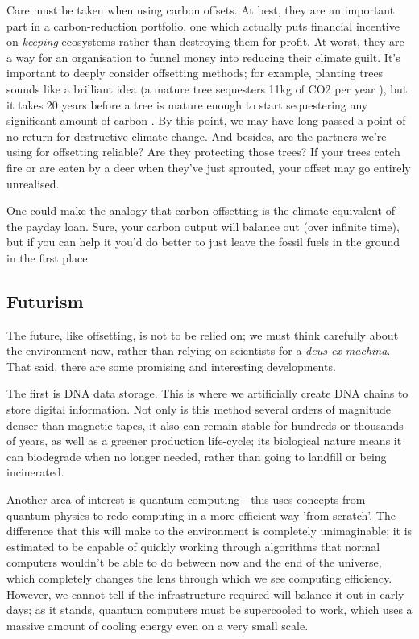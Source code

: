 \documentclass{article}
\begin{document}
Care must be taken when using carbon offsets. At best, they are an important part in a carbon-reduction portfolio, one which actually puts financial incentive on \emph{keeping} ecosystems rather than destroying them for profit. At worst, they are a way for an organisation to funnel money into reducing their climate guilt. It's important to deeply consider offsetting methods; for example, planting trees sounds like a brilliant idea (a mature tree sequesters 11kg of CO2 per year \citep{akbari2002shade}), but it takes 20 years before a tree is mature enough to start sequestering any significant amount of carbon \citep{ghussain2020biggest}. By this point, we may have long passed a point of no return for destructive climate change. And besides, are the partners we're using for offsetting reliable? Are they protecting those trees? If your trees catch fire or are eaten by a deer when they've just sprouted, your offset may go entirely unrealised. \newline

One could make the analogy that carbon offsetting is the climate equivalent of the payday loan. Sure, your carbon output will balance out (over infinite time), but if you can help it you'd do better to just leave the fossil fuels in the ground in the first place.

\subsection{Futurism}
The future, like offsetting, is not to be relied on; we must think carefully about the environment now, rather than relying on scientists for a \emph{deus ex machina}. That said, there are some promising and interesting developments.\newline

The first is DNA data storage. This is where we artificially create DNA chains to store digital information. Not only is this method several orders of magnitude denser than magnetic tapes, it also can remain stable for hundreds or thousands of years, as well as a greener production life-cycle; its biological nature means it can biodegrade when no longer needed, rather than going to landfill or being incinerated. \citep{nguyen2020architecting}\newline

Another area of interest is quantum computing - this uses concepts from quantum physics to redo computing in a more efficient way 'from scratch'. The difference that this will make to the environment is completely unimaginable; it is estimated to be capable of quickly working through algorithms that normal computers wouldn't be able to do between now and the end of the universe, which completely changes the lens through which we see computing efficiency. However, we cannot tell if the infrastructure required will balance it out in early days; as it stands, quantum computers must be supercooled to work, which uses a massive amount of cooling energy even on a very small scale.
\end{document}
